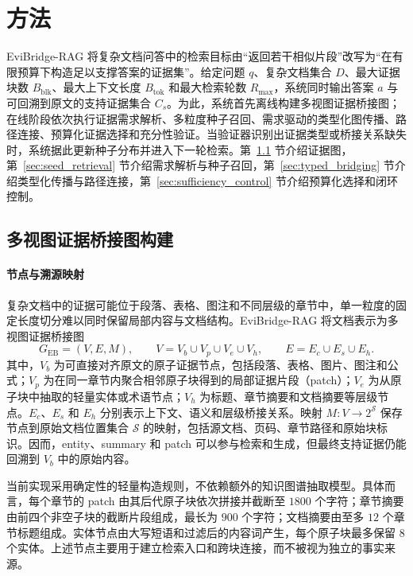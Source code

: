 
\section{方法}

EviBridge-RAG 将复杂文档问答中的检索目标由``返回若干相似片段''改写为``在有限预算下构造足以支撑答案的证据集''。给定问题 $q$、复杂文档集合 $D$、最大证据块数 $B_{\mathrm{blk}}$、最大上下文长度 $B_{\mathrm{tok}}$ 和最大检索轮数 $R_{\max}$，系统同时输出答案 $a$ 与可回溯到原文的支持证据集合 $C_s$。为此，系统首先离线构建多视图证据桥接图；在线阶段依次执行证据需求解析、多粒度种子召回、需求驱动的类型化图传播、路径连接、预算化证据选择和充分性验证。当验证器识别出证据类型或桥接关系缺失时，系统据此更新种子分布并进入下一轮检索。第~\ref{sec:graph_construction} 节介绍证据图，第~\ref{sec:seed_retrieval} 节介绍需求解析与种子召回，第~\ref{sec:typed_bridging} 节介绍类型化传播与路径连接，第~\ref{sec:sufficiency_control} 节介绍预算化选择和闭环控制。

\subsection{多视图证据桥接图构建}
\label{sec:graph_construction}

\paragraph{节点与溯源映射}
复杂文档中的证据可能位于段落、表格、图注和不同层级的章节中，单一粒度的固定长度切分难以同时保留局部内容与文档结构。EviBridge-RAG 将文档表示为多视图证据桥接图
\begin{equation}
\label{eq:evibridge_graph}
G_{\mathrm{EB}}=(V,E,M),\qquad
V=V_b\cup V_p\cup V_e\cup V_h,\qquad
E=E_c\cup E_s\cup E_h .
\end{equation}
其中，$V_b$ 为可直接对齐原文的原子证据节点，包括段落、表格、图片、图注和公式；$V_p$ 为在同一章节内聚合相邻原子块得到的局部证据片段（patch）；$V_e$ 为从原子块中抽取的轻量实体或术语节点；$V_h$ 为标题、章节摘要和文档摘要等层级节点。$E_c$、$E_s$ 和 $E_h$ 分别表示上下文、语义和层级桥接关系。映射 $M:V\rightarrow 2^{\mathcal{S}}$ 保存节点到原始文档位置集合 $\mathcal{S}$ 的映射，包括源文档、页码、章节路径和原始块标识。因而，entity、summary 和 patch 可以参与检索和生成，但最终支持证据仍能回溯到 $V_b$ 中的原始内容。

当前实现采用确定性的轻量构造规则，不依赖额外的知识图谱抽取模型。具体而言，每个章节的 patch 由其后代原子块依次拼接并截断至 $1800$ 个字符；章节摘要由前四个非空子块的截断片段组成，最长为 $900$ 个字符；文档摘要由至多 $12$ 个章节标题组成。实体节点由大写短语和过滤后的内容词产生，每个原子块最多保留 $8$ 个实体。上述节点主要用于建立检索入口和跨块连接，而不被视为独立的事实来源。

